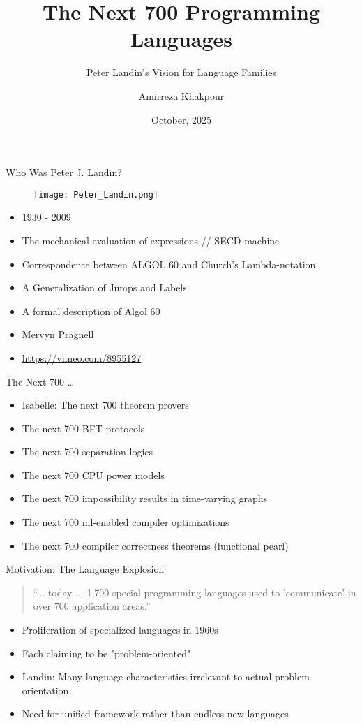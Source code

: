 \documentclass[10pt]{beamer}
\title{The Next 700 Programming Languages}
\subtitle{Peter Landin's Vision for Language Families}
\author{Amirreza Khakpour}
\date{October, 2025}
\begin{document}
\begin{frame}
\titlepage
\end{frame}

\begin{frame}{Who Was Peter J. Landin?}
\begin{figure}
  \texttt{[image: Peter\_Landin.png]}
\end{figure}
\begin{itemize}
\item 1930 {-} 2009
\item The mechanical evaluation of expressions // SECD machine
\item Correspondence between ALGOL 60 and Church's Lambda-notation
\item A Generalization of Jumps and Labels
\item A formal description of Algol 60
\item Mervyn Pragnell
\item \url{https://vimeo.com/8955127}
\end{itemize}
\end{frame}

\begin{frame}{The Next 700 \ldots}
\begin{itemize}
\item Isabelle: The next 700 theorem provers
\item The next 700 BFT protocols
\item The next 700 separation logics
\item The next 700 CPU power models
\item The next 700 impossibility results in time-varying graphs
\item The next 700 ml-enabled compiler optimizations
\item The next 700 compiler correctness theorems (functional pearl)
\end{itemize}
\end{frame}
\begin{frame}{Motivation: The Language Explosion}
\begin{quote}
``... today ... 1,700 special programming languages used to 'communicate' in over 700 application areas.''
\end{quote}
\begin{itemize}
\item Proliferation of specialized languages in 1960s
\item Each claiming to be "problem-oriented"
\item Landin: Many language characteristics irrelevant to actual problem orientation
\item Need for unified framework rather than endless new languages
\end{itemize}
\end{frame}
\end{document}

